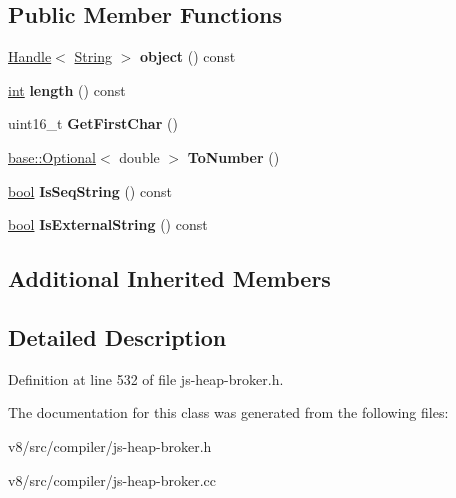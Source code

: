 \subsection*{Public Member Functions}
\begin{DoxyCompactItemize}
\item 
\mbox{\label{classv8_1_1internal_1_1compiler_1_1StringRef_ad3d4f26c5d8ea3a861b470ac7ea5efc9}} 
\mbox{\hyperlink{classv8_1_1internal_1_1Handle}{Handle}}$<$ \mbox{\hyperlink{classv8_1_1internal_1_1String}{String}} $>$ {\bfseries object} () const
\item 
\mbox{\label{classv8_1_1internal_1_1compiler_1_1StringRef_a39c8700d733d5f860d8e83ca1d852aab}} 
\mbox{\hyperlink{classint}{int}} {\bfseries length} () const
\item 
\mbox{\label{classv8_1_1internal_1_1compiler_1_1StringRef_ad834b470a8ac7ab55581b2906606c659}} 
uint16\+\_\+t {\bfseries Get\+First\+Char} ()
\item 
\mbox{\label{classv8_1_1internal_1_1compiler_1_1StringRef_a9dcc706030ca8d6728f1b3cdedfb1a0c}} 
\mbox{\hyperlink{classv8_1_1base_1_1Optional}{base\+::\+Optional}}$<$ double $>$ {\bfseries To\+Number} ()
\item 
\mbox{\label{classv8_1_1internal_1_1compiler_1_1StringRef_acde590f4ba22e03ed5d764cbbabf8892}} 
\mbox{\hyperlink{classbool}{bool}} {\bfseries Is\+Seq\+String} () const
\item 
\mbox{\label{classv8_1_1internal_1_1compiler_1_1StringRef_a0b50eb2312a4388d8b824ab3ae46f74a}} 
\mbox{\hyperlink{classbool}{bool}} {\bfseries Is\+External\+String} () const
\end{DoxyCompactItemize}
\subsection*{Additional Inherited Members}


\subsection{Detailed Description}


Definition at line 532 of file js-\/heap-\/broker.\+h.



The documentation for this class was generated from the following files\+:\begin{DoxyCompactItemize}
\item 
v8/src/compiler/js-\/heap-\/broker.\+h\item 
v8/src/compiler/js-\/heap-\/broker.\+cc\end{DoxyCompactItemize}

